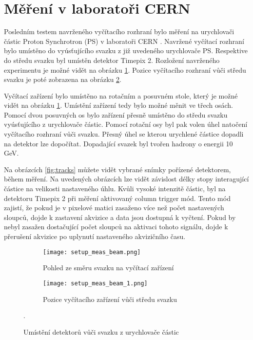 \section{Měření v laboratoři CERN}
	Posledním testem navrženého vyčítacího rozhraní bylo měření na urychlovači částic Proton Synchrotron (PS) \cite{PS} v laboratoři CERN \cite{CERN}. Navržené vyčítací rozhraní bylo umístěno do vyúsťujícího svazku z již uvedeného urychlovače PS. Respektive do středu svazku byl umístěn detektor Timepix 2. Rozložení navrženého experimentu je možné vidět na obrázku \ref{fig:setup_meas_beam}. Pozice vyčítacího rozhraní vůči středu svazku je poté zobrazena na obrázku \ref{fig:setup_meas_beam_1}.
	\par
	Vyčítací zařízení bylo umístěno na rotačním a posuvném stole, který je možné vidět na obrázku \ref{fig:setup_meas_beam}. Umístění zařízení tedy bylo možné měnit ve třech osách. Pomocí dvou posuvných os bylo zařízení přesně umístěno do středu svazku vyúsťujícího z urychlovače částic. Pomocí rotační osy byl pak volen úhel natočení vyčítacího rozhraní vůči svazku. Přesný úhel se kterou urychlené částice dopadli na detektor lze dopočítat. Dopadající svazek byl tvořen hadrony o energii 10 GeV.
	\par
	 Na obrázcích \ref{fig:tracks} můžete vidět vybrané snímky pořízené detektorem, během měření. Na uvedených obrázcích lze vidět závislost délky stopy interagující částice na velikosti nastaveného úhlu. Kvůli vysoké intenzitě částic, byl na detektoru Timepix 2 při měření aktivovaný column trigger mód. Tento mód zajistí, že pokud je v pixelové matici zasaženo více než počet nastavených sloupců, dojde k zastavení akvizice a data jsou dostupná k vyčtení. Pokud by nebyl zasažen dostačující počet sloupců na aktivaci tohoto signálu, dojde k přerušení akvizice po uplynutí nastaveného akvizičního času.
	
	\begin{figure}[h!]
		\captionsetup{justification=centering}
		\begin{subfigure}{0.5\textwidth}
			\centering
			\texttt{[image: setup\_meas\_beam.png]}
			\caption{Pohled ze směru svazku na vyčítací zařízení}
			\label{fig:setup_meas_beam}
		\end{subfigure}
		\begin{subfigure}{0.5\textwidth}
			\centering
			\texttt{[image: setup\_meas\_beam\_1.png]}
			\caption{Pozice vyčítacího zařízení vůči středu svazku}
			\label{fig:setup_meas_beam_1}
		\end{subfigure}
		\caption{Umístění detektorů vůči svazku z urychlovače částic}. %
		\label{fig:T_all}
	\end{figure}

